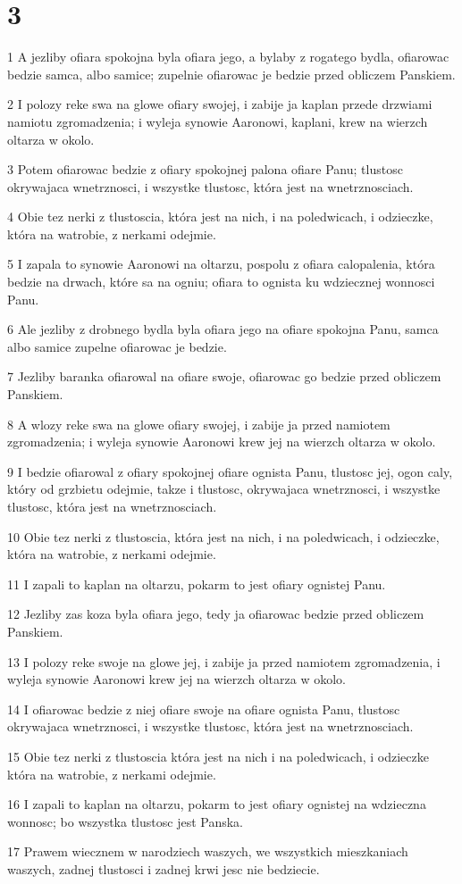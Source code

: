 \chapter{3}

\par 1 A jezliby ofiara spokojna byla ofiara jego, a bylaby z rogatego bydla, ofiarowac bedzie samca, albo samice; zupelnie ofiarowac je bedzie przed obliczem Panskiem.
\par 2 I polozy reke swa na glowe ofiary swojej, i zabije ja kaplan przede drzwiami namiotu zgromadzenia; i wyleja synowie Aaronowi, kaplani, krew na wierzch oltarza w okolo.
\par 3 Potem ofiarowac bedzie z ofiary spokojnej palona ofiare Panu; tlustosc okrywajaca wnetrznosci, i wszystke tlustosc, która jest na wnetrznosciach.
\par 4 Obie tez nerki z tlustoscia, która jest na nich, i na poledwicach, i odzieczke, która na watrobie, z nerkami odejmie.
\par 5 I zapala to synowie Aaronowi na oltarzu, pospolu z ofiara calopalenia, która bedzie na drwach, które sa na ogniu; ofiara to ognista ku wdziecznej wonnosci Panu.
\par 6 Ale jezliby z drobnego bydla byla ofiara jego na ofiare spokojna Panu, samca albo samice zupelne ofiarowac je bedzie.
\par 7 Jezliby baranka ofiarowal na ofiare swoje, ofiarowac go bedzie przed obliczem Panskiem.
\par 8 A wlozy reke swa na glowe ofiary swojej, i zabije ja przed namiotem zgromadzenia; i wyleja synowie Aaronowi krew jej na wierzch oltarza w okolo.
\par 9 I bedzie ofiarowal z ofiary spokojnej ofiare ognista Panu, tlustosc jej, ogon caly, który od grzbietu odejmie, takze i tlustosc, okrywajaca wnetrznosci, i wszystke tlustosc, która jest na wnetrznosciach.
\par 10 Obie tez nerki z tlustoscia, która jest na nich, i na poledwicach, i odzieczke, która na watrobie, z nerkami odejmie.
\par 11 I zapali to kaplan na oltarzu, pokarm to jest ofiary ognistej Panu.
\par 12 Jezliby zas koza byla ofiara jego, tedy ja ofiarowac bedzie przed obliczem Panskiem.
\par 13 I polozy reke swoje na glowe jej, i zabije ja przed namiotem zgromadzenia, i wyleja synowie Aaronowi krew jej na wierzch oltarza w okolo.
\par 14 I ofiarowac bedzie z niej ofiare swoje na ofiare ognista Panu, tlustosc okrywajaca wnetrznosci, i wszystke tlustosc, która jest na wnetrznosciach.
\par 15 Obie tez nerki z tlustoscia która jest na nich i na poledwicach, i odzieczke która na watrobie, z nerkami odejmie.
\par 16 I zapali to kaplan na oltarzu, pokarm to jest ofiary ognistej na wdzieczna wonnosc; bo wszystka tlustosc jest Panska.
\par 17 Prawem wiecznem w narodziech waszych, we wszystkich mieszkaniach waszych, zadnej tlustosci i zadnej krwi jesc nie bedziecie.

